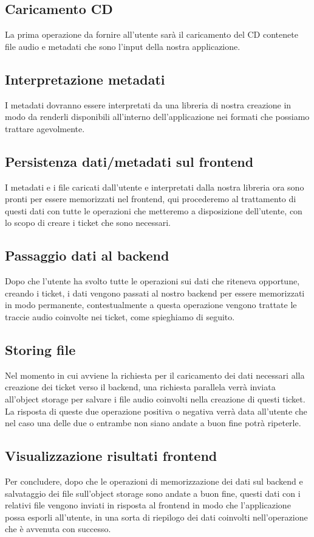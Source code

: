 \subsection*{Caricamento CD}
La prima operazione da fornire all'utente sarà il caricamento del CD contenete file audio e metadati che sono l'input della nostra applicazione.
\subsection*{Interpretazione metadati}
I metadati dovranno essere interpretati da una libreria di nostra creazione in modo da renderli disponibili all'interno dell'applicazione nei formati che possiamo trattare
agevolmente.
\subsection*{Persistenza dati/metadati sul frontend}
I metadati e i file caricati dall'utente e interpretati dalla nostra libreria ora sono pronti per essere memorizzati nel frontend, qui procederemo al trattamento di questi
dati con tutte le operazioni che metteremo a disposizione dell'utente, con lo scopo di creare i ticket che sono necessari.
\subsection*{Passaggio dati al backend}
Dopo che l'utente ha svolto tutte le operazioni sui dati che riteneva opportune, creando i ticket, i dati vengono passati al nostro backend per essere memorizzati
in modo permanente, contestualmente a questa operazione vengono trattate le traccie audio coinvolte nei ticket, come spieghiamo di seguito.
\subsection*{Storing file}
Nel momento in cui avviene la richiesta per il caricamento dei dati necessari alla creazione dei ticket verso il backend, una richiesta parallela verrà inviata all'object storage
per salvare i file audio coinvolti nella creazione di questi ticket. La risposta di queste due operazione positiva o negativa verrà data all'utente che nel caso una delle
due o entrambe non siano andate a buon fine potrà ripeterle.
\subsection*{Visualizzazione risultati frontend}
Per concludere, dopo che le operazioni di memorizzazione dei dati sul backend e salvataggio dei file sull'object storage sono andate a buon fine, questi dati con i relativi file
vengono inviati in risposta al frontend in modo che l'applicazione possa esporli all'utente, in una sorta di riepilogo dei dati coinvolti nell'operazione che è avvenuta con successo.


